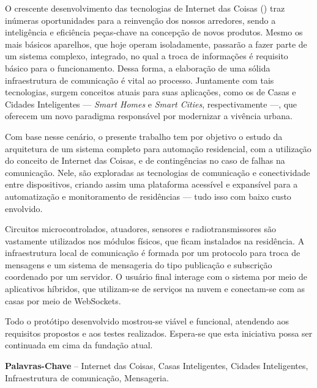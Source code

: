 \begin{resumo}

O crescente desenvolvimento das tecnologias de Internet das Coisas (\wiot) traz inúmeras oportunidades para a reinvenção dos nossos arredores, sendo a inteligência e eficiência peças-chave na concepção de novos produtos. Mesmo os mais básicos aparelhos, que hoje operam isoladamente, passarão a fazer parte de um sistema complexo, integrado, no qual a troca de informações é requisito básico para o funcionamento. Dessa forma, a elaboração de uma sólida infraestrutura de comunicação é vital ao processo. Juntamente com tais tecnologias, surgem conceitos atuais para suas aplicações, como os de Casas e Cidades Inteligentes --- \textit{Smart Homes} e \textit{Smart Cities}, respectivamente ---, que oferecem um novo paradigma responsável por modernizar a vivência urbana.

Com base nesse cenário, o presente trabalho tem por objetivo o estudo da arquitetura de um sistema completo para automação residencial, com a utilização do conceito de Internet das Coisas, e de contingências no caso de falhas na comunicação. Nele, são exploradas as tecnologias de comunicação e conectividade entre dispositivos, criando assim uma plataforma acessível e expansível para a automatização e monitoramento de residências --- tudo isso com baixo custo envolvido.

Circuitos microcontrolados, atuadores, sensores e radiotransmissores são vastamente utilizados nos módulos físicos, que ficam instalados na residência. A infraestrutura local de comunicação é formada por um protocolo para troca de mensagens e um sistema de mensageria do tipo publicação e subscrição coordenado por um servidor. O usuário final interage com o sistema por meio de aplicativos híbridos, que utilizam-se de serviços na nuvem e conectam-se com as casas por meio de WebSockets.

Todo o protótipo desenvolvido mostrou-se viável e funcional, atendendo aos requisitos propostos e aos testes realizados. Espera-se que esta iniciativa possa ser continuada em cima da fundação atual.

%
\textbf{Palavras-Chave} -- Internet das Coisas, Casas Inteligentes, Cidades Inteligentes, Infraestrutura de comunicação, Mensageria.
\end{resumo}
